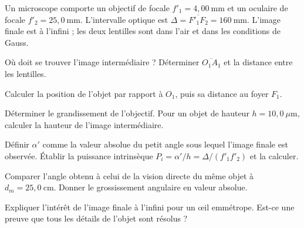 \label{ex-D3}
Un microscope comporte un objectif de focale $f'_1=4{,}00\ \mathrm{mm}$ et un oculaire de focale $f'_2=25{,}0\ \mathrm{mm}$. L'intervalle optique est $\Delta=\overline{F'_1F_2}=160\ \mathrm{mm}$. L'image finale est à l'infini ; les deux lentilles sont dans l'air et dans les conditions de Gauss.
\begin{questions}
\item Où doit se trouver l'image intermédiaire ? Déterminer $\overline{O_1A_1}$ et la distance entre les lentilles.
\item Calculer la position de l'objet par rapport à $O_1$, puis sa distance au foyer $F_1$.
\item Déterminer le grandissement de l'objectif. Pour un objet de hauteur $h=10{,}0\ \mu\mathrm{m}$, calculer la hauteur de l'image intermédiaire.
\item Définir $\alpha'$ comme la valeur absolue du petit angle sous lequel l'image finale est observée. Établir la puissance intrinsèque $P_i=\alpha'/h=\Delta/(f'_1f'_2)$ et la calculer.
\item Comparer l'angle obtenu à celui de la vision directe du même objet à $d_m=25{,}0\ \mathrm{cm}$. Donner le grossissement angulaire en valeur absolue.
\item Expliquer l'intérêt de l'image finale à l'infini pour un œil emmétrope. Est-ce une preuve que tous les détails de l'objet sont résolus ?
\end{questions}

